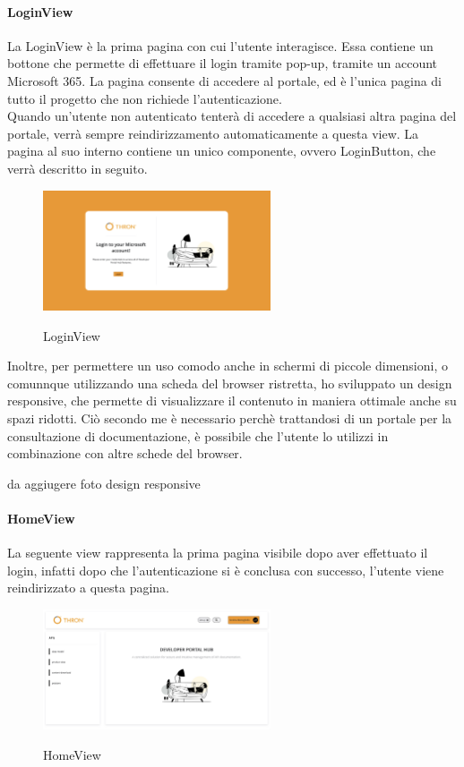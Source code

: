 \paragraph{LoginView}\label{par:ogin-view}
La LoginView è la prima pagina con cui l'utente interagisce. Essa contiene un bottone che permette di effettuare il login tramite pop-up, tramite un account Microsoft 365.
La pagina consente di accedere al portale, ed è l'unica pagina di tutto il progetto che non richiede l'autenticazione.\\
Quando un'utente non autenticato tenterà di accedere a qualsiasi altra pagina del portale, verrà sempre reindirizzamento
automaticamente a questa view.
La pagina al suo interno contiene un unico componente, ovvero LoginButton, che verrà descritto in seguito.
\begin{figure}[ht]
  \centering
  \includegraphics[width=0.6\textwidth, alt={Pagina di login dell'applicazione}]{images/frontend/LoginView.jpg}
  \caption{LoginView}\label{fig:login-view}
\end{figure}
Inoltre, per permettere un uso comodo anche in schermi di piccole dimensioni, o comunnque utilizzando una scheda del browser ristretta, ho sviluppato
un design responsive, che permette di visualizzare il contenuto in maniera ottimale anche su spazi ridotti. 
Ciò secondo me è necessario perchè trattandosi di un portale per la consultazione di documentazione, è possibile che l'utente 
lo utilizzi in combinazione con altre schede del browser.



da aggiugere foto design responsive


\paragraph{HomeView}\label{par:home-view}
La seguente view rappresenta la prima pagina visibile dopo aver effettuato il login, infatti dopo che l'autenticazione si è conclusa con successo, 
l'utente viene reindirizzato a questa pagina.

\begin{figure}[ht]
  \centering
  \includegraphics[width=0.6\textwidth, alt={Pagina principale dell'applicazione}]{images/frontend/HomeView.jpg}
  \caption{HomeView}\label{fig:home-view}
\end{figure}

